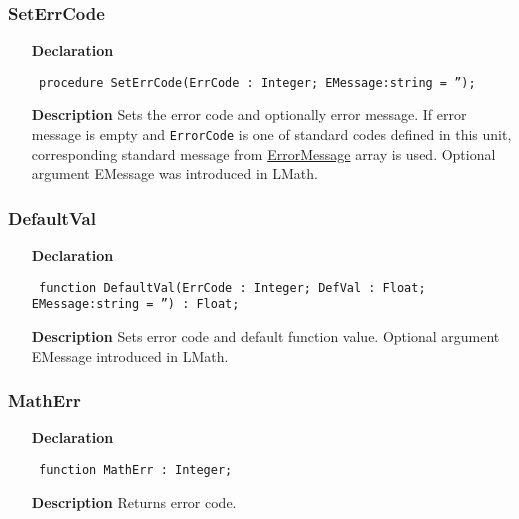 \documentclass[12pt,a4paper,oneside]{report}
\newcommand{\lmath}[1]{   %
	\marginpar{\vspace{#1} 
		\begin{flushright}
			LMath
	\end{flushright} }
}
\newcommand{\declarationitem}[1]{\textbf{#1}}
\newcommand{\descriptiontitle}[1]{\textbf{#1}}
\newcommand{\code}[1]{\texttt{#1}}
\begin{document}
\subsubsection{SetErrCode}\lmath{-24pt}
\label{uErrors-SetErrCode}
\begin{itemize}\item[\declarationitem{Declaration}\hfill]
	\begin{flushleft}
		\code{
			procedure SetErrCode(ErrCode : Integer; EMessage:string = '');}
	\end{flushleft}
	\item[\descriptiontitle{Description}]
	Sets the error code and optionally error message. If error message is empty and \code{ErrorCode} is one of standard codes 
defined in this unit, corresponding standard message from \hyperref[uErrors-ErrorMessage]{ErrorMessage} array is used. Optional argument EMessage was introduced in LMath.
\end{itemize}
\subsubsection{DefaultVal}\lmath{-24pt}
\label{uErrors-DefaultVal}
\begin{itemize}\item[\declarationitem{Declaration}\hfill]
	\begin{flushleft}
		\code{
			function DefaultVal(ErrCode : Integer; DefVal : Float; EMessage:string = '') : Float;}
		
	\end{flushleft}
	
	\par
	\item[\descriptiontitle{Description}]
	Sets error code and default function value. Optional argument EMessage introduced in LMath.
\end{itemize}
\subsubsection{MathErr}
\label{uErrors-MathErr}
\begin{itemize}\item[\declarationitem{Declaration}\hfill]
	\begin{flushleft}
		\code{
			function MathErr : Integer;}
	\end{flushleft}
	\item[\descriptiontitle{Description}]
	Returns error code.
\end{itemize}
\end{document}
